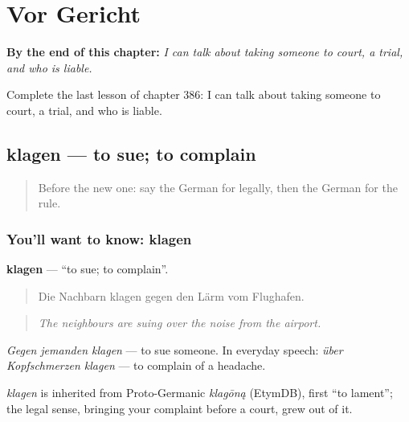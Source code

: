 
\chapter{Vor Gericht}
\label{ch:ge-vor-gericht}

\begin{chapteropening}
\textbf{By the end of this chapter:} \emph{I can talk about taking someone to court, a trial, and who is liable.}

Complete the last lesson of chapter 386: I can talk about taking someone to court, a trial, and who is liable.
\end{chapteropening}

\section[klagen]{klagen — to sue; to complain}

\label{lesson:GE-C386-klagen}



\begin{quote}
Before the new one: say the German for legally, then the German for the rule.
\end{quote}

\subsection*{You'll want to know: klagen}
\textbf{klagen} — \textquotedblleft{}to sue; to complain\textquotedblright{}.

\begin{quote}
Die Nachbarn klagen gegen den Lärm vom Flughafen.
\end{quote}

\begin{quote}
\emph{The neighbours are suing over the noise from the airport.}
\end{quote}

\emph{Gegen jemanden klagen} — to sue someone. In everyday speech: \emph{über Kopfschmerzen klagen} — to complain of a headache.

\begin{cousinweb}
\emph{klagen} is inherited from Proto-Germanic \emph{klagōną} (EtymDB), first \textquotedblleft{}to lament\textquotedblright{}; the legal sense, bringing your complaint before a court, grew out of it.
\end{cousinweb}

